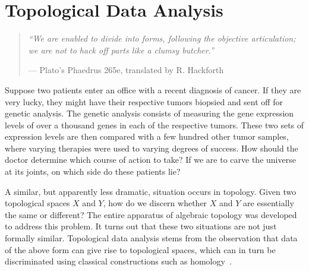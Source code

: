 

%
%
\chapter{Topological Data Analysis}
\label{sec:barcodes}


\begin{quote}
{\em``We are enabled to divide into forms, following the objective articulation; we are not to hack off parts like a clumsy butcher.''}
\begin{flushright} --- Plato's Phaedrus 265e, translated by R. Hackforth \end{flushright}
\end{quote}

Suppose two patients enter an office with a recent diagnosis of cancer. If they are very lucky, they might have their respective tumors biopsied and sent off for genetic analysis. The genetic analysis consists of measuring the gene expression levels of over a thousand genes in each of the respective tumors. These two sets of expression levels are then compared with a few hundred other tumor samples, where varying therapies were used to varying degrees of success. How should the doctor determine which course of action to take? If we are to carve the universe at its joints, on which side do these patients lie?

A similar, but apparently less dramatic, situation occurs in topology. Given two topological spaces $X$ and $Y$, how do we discern whether $X$ and $Y$ are essentially the same or different? The entire apparatus of algebraic topology was developed to address this problem. It turns out that these two situations are not just formally similar. Topological data analysis stems from the observation that data of the above form can give rise to topological spaces, which can in turn be discriminated using classical constructions such as homology~\cite{lum2013extracting}.

